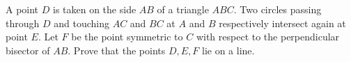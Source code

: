 A point $ D$ is taken on the side $ AB$ of a triangle $ ABC$. Two circles passing through $ D$ and touching $ AC$ and $ BC$ at $ A$ and $ B$ respectively intersect again at point $ E$. Let $ F$ be the point symmetric to $ C$ with respect to the perpendicular bisector of $ AB$. Prove that the points $ D,E,F$ lie on a line.